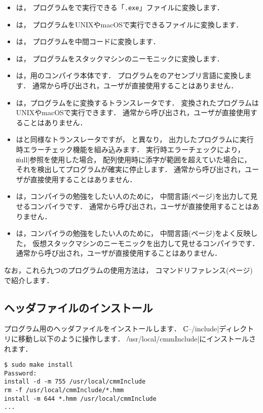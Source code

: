 \begin{itemize}
\item {\cme}は，
{\cmm}プログラムを{\tac}で実行できる「{\tt .exe}」ファイルに変換します．
\item {\cmc}は，
{\cmm}プログラムをUNIXやmacOSで実行できるファイルに変換します．
\item {\cmi}は，
{\cmm}プログラムを中間コードに変換します．
\item {\cmv}は，
{\cmm}プログラムをスタックマシンのニーモニックに変換します．
\item {\cmmc}は，{\tac}用の{\cmml}コンパイラ本体です．
{\cmm}プログラムを{\tac}のアセンブリ言語に変換します．
通常{\cme}から呼び出され，ユーザが直接使用することはありません．
\item {\ccmmc}は，{\cmm}プログラムを{\cl}に変換するトランスレータです．
変換された{\cl}プログラムはUNIXやmacOSで実行できます．
通常{\cmc}から呼び出され，ユーザが直接使用することはありません．
\item {\rtccmmc}は{\ccmmc}と同様なトランスレータですが，
{\ccmmc}と異なり，
出力したプログラムに実行時エラーチェック機能を組み込みます．
実行時エラーチェックにより，
\|null|参照を使用した場合，
配列使用時に添字が範囲を超えていた場合に，
それを検出してプログラムが確実に停止します．
通常{\cmc}から呼び出され，ユーザが直接使用することはありません．
\item {\icmmc}は，コンパイラの勉強をしたい人のために，
中間言語(\pageref{app:vm}ページ)を出力して見せるコンパイラです．
通常{\cmi}から呼び出され，ユーザが直接使用することはありません．
\item {\vcmmc}は，コンパイラの勉強をしたい人のために，
中間言語(\pageref{app:vm}ページ)をよく反映した，
仮想スタックマシンのニーモニックを出力して見せるコンパイラです．
通常{\cmv}から呼び出され，ユーザが直接使用することはありません．
\end{itemize}

なお，これら九つのプログラムの使用方法は，
コマンドリファレンス(\pageref{app:command}ページ)で紹介します．

\subsection{ヘッダファイルのインストール}

{\cmml}プログラム用のヘッダファイルをインストールします．
\|C--/include|ディレクトリに移動し以下のように操作します．
\|/usr/local/cmmInclude|にインストールされます．

\begin{mylist}
\begin{verbatim}
$ sudo make install
Password:
install -d -m 755 /usr/local/cmmInclude
rm -f /usr/local/cmmInclude/*.hmm
install -m 644 *.hmm /usr/local/cmmInclude
...
\end{verbatim}
\end{mylist}

